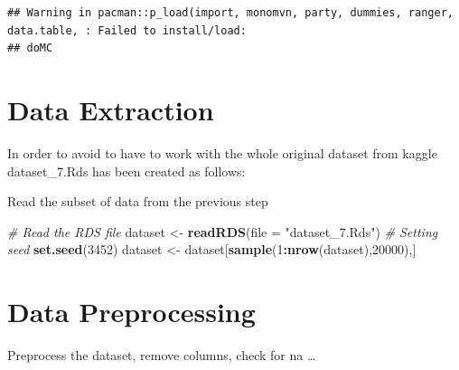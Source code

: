\documentclass[]{article}
\newenvironment{Shaded}{\begin{snugshade}}{\end{snugshade}}
\newcommand{\CommentTok}[1]{\textcolor[rgb]{0.56,0.35,0.01}{\textit{#1}}}
\newcommand{\DataTypeTok}[1]{\textcolor[rgb]{0.13,0.29,0.53}{#1}}
\newcommand{\DecValTok}[1]{\textcolor[rgb]{0.00,0.00,0.81}{#1}}
\newcommand{\KeywordTok}[1]{\textcolor[rgb]{0.13,0.29,0.53}{\textbf{#1}}}
\newcommand{\NormalTok}[1]{#1}
\newcommand{\OperatorTok}[1]{\textcolor[rgb]{0.81,0.36,0.00}{\textbf{#1}}}
\newcommand{\StringTok}[1]{\textcolor[rgb]{0.31,0.60,0.02}{#1}}
\begin{document}
\begin{verbatim}
## Warning in pacman::p_load(import, monomvn, party, dummies, ranger, data.table, : Failed to install/load:
## doMC
\end{verbatim}

\pagebreak

\hypertarget{data-extraction}{%
\section{Data Extraction}\label{data-extraction}}

In order to avoid to have to work with the whole original dataset from
kaggle dataset\_7.Rds has been created as follows:

Read the subset of data from the previous step

\begin{Shaded}
\begin{Highlighting}[]
\CommentTok{# Read the RDS file}
\NormalTok{dataset <-}\StringTok{ }\KeywordTok{readRDS}\NormalTok{(}\DataTypeTok{file =} \StringTok{"dataset_7.Rds"}\NormalTok{)}
\CommentTok{# Setting seed}
\KeywordTok{set.seed}\NormalTok{(}\DecValTok{3452}\NormalTok{)}
\NormalTok{dataset <-}\StringTok{ }\NormalTok{dataset[}\KeywordTok{sample}\NormalTok{(}\DecValTok{1}\OperatorTok{:}\KeywordTok{nrow}\NormalTok{(dataset),}\DecValTok{20000}\NormalTok{),]}
\end{Highlighting}
\end{Shaded}

\hypertarget{data-preprocessing}{%
\section{Data Preprocessing}\label{data-preprocessing}}

Preprocess the dataset, remove columns, check for na \ldots{}
\end{document}
